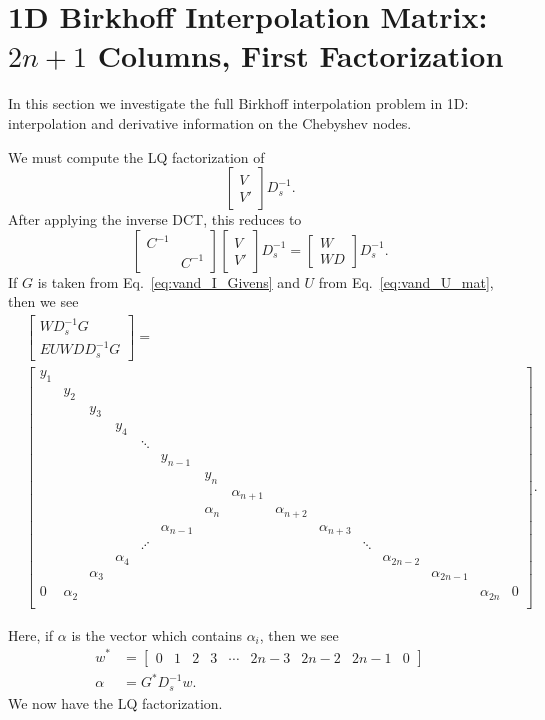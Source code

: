 \section{1D \CV{} Birkhoff Interpolation Matrix: $2n+1$ Columns,
First Factorization}
\label{sec:CV_ID_1D_2n_F1}

In this section we investigate the full Birkhoff interpolation
problem in 1D: interpolation and derivative information on the
Chebyshev nodes.

We must compute the LQ factorization of
%
\begin{equation}
    \begin{bmatrix} V \\ V' \end{bmatrix} D_{s}^{-1}.
\end{equation}
%
After applying the inverse DCT, this reduces to 
%
\begin{equation}
    \begin{bmatrix} C^{-1} & \\ & C^{-1} \end{bmatrix}
    \begin{bmatrix} V \\ V' \end{bmatrix} D_{s}^{-1}
    = \begin{bmatrix} W \\ WD \end{bmatrix} D_{s}^{-1}.
\end{equation}
%
If $G$ is taken from Eq.~\eqref{eq:vand_I_Givens} and $U$ from
Eq.~\eqref{eq:vand_U_mat}, then we see
%
\begin{align}
    &\begin{bmatrix} WD_{s}^{-1}G \\ EUWDD_{s}^{-1}G \end{bmatrix}
        = \nonumber\\
    &\begin{bmatrix}
        y_{1} \\  & y_{2} \\ & & y_{3} \\ & & & y_{4} \\ & & & & \ddots \\
        & & & & & y_{n-1} \\
        & & & & & & y_{n} \\
        & & & & & & & \alpha_{n+1} \\
        & & & & & & \alpha_{n} & & \alpha_{n+2} \\
        & & & & & \alpha_{n-1} & & & & \alpha_{n+3} \\
        & & & & \iddots & & & & & & \ddots \\
        & & & \alpha_{4} & & & & & & & & \alpha_{2n-2} \\
        & & \alpha_{3} & & & & & & & & & & \alpha_{2n-1} \\
        0 & \alpha_{2} & & & & & & & & & & & & \alpha_{2n} & 0 \\
    \end{bmatrix}.
\end{align}

\noindent
Here, if $\alpha$ is the vector which contains $\alpha_{i}$, then
we see
%
\begin{align}
    w^{*} &= \begin{bmatrix} 0 & 1 & 2 & 3 & \cdots &
            2n-3 & 2n-2 & 2n-1 & 0 \end{bmatrix} \nonumber\\
    \alpha &= G^{*}D_{s}^{-1}w.
\end{align}
%
We now have the LQ factorization.
